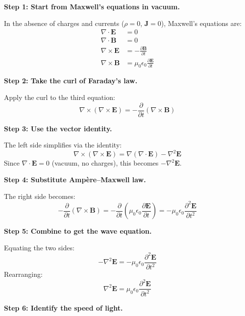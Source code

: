 \textbf{Step 1: Start from Maxwell's equations in vacuum.}

In the absence of charges and currents ($\rho = 0$, $\mathbf{J} = 0$), Maxwell's equations are:
\begin{align}
\nabla \cdot \mathbf{E} &= 0 \\
\nabla \cdot \mathbf{B} &= 0 \\
\nabla \times \mathbf{E} &= -\frac{\partial \mathbf{B}}{\partial t} \\
\nabla \times \mathbf{B} &= \mu_0\epsilon_0\frac{\partial \mathbf{E}}{\partial t}
\end{align}

\textbf{Step 2: Take the curl of Faraday's law.}

Apply the curl to the third equation:
\begin{equation}
\nabla \times (\nabla \times \mathbf{E}) = -\frac{\partial}{\partial t}(\nabla \times \mathbf{B})
\end{equation}

\textbf{Step 3: Use the vector identity.}

The left side simplifies via the identity:
\begin{equation}
\nabla \times (\nabla \times \mathbf{E}) = \nabla(\nabla \cdot \mathbf{E}) - \nabla^2 \mathbf{E}
\end{equation}
Since $\nabla \cdot \mathbf{E} = 0$ (vacuum, no charges), this becomes $-\nabla^2 \mathbf{E}$.

\textbf{Step 4: Substitute Amp\`ere--Maxwell law.}

The right side becomes:
\begin{equation}
-\frac{\partial}{\partial t}(\nabla \times \mathbf{B}) = -\frac{\partial}{\partial t}\left(\mu_0\epsilon_0\frac{\partial \mathbf{E}}{\partial t}\right) = -\mu_0\epsilon_0\frac{\partial^2 \mathbf{E}}{\partial t^2}
\end{equation}

\textbf{Step 5: Combine to get the wave equation.}

Equating the two sides:
\begin{equation}
-\nabla^2 \mathbf{E} = -\mu_0\epsilon_0\frac{\partial^2 \mathbf{E}}{\partial t^2}
\end{equation}
Rearranging:
\begin{equation}
\boxed{\nabla^2 \mathbf{E} = \mu_0\epsilon_0\frac{\partial^2 \mathbf{E}}{\partial t^2}}
\end{equation}

\textbf{Step 6: Identify the speed of light.}

